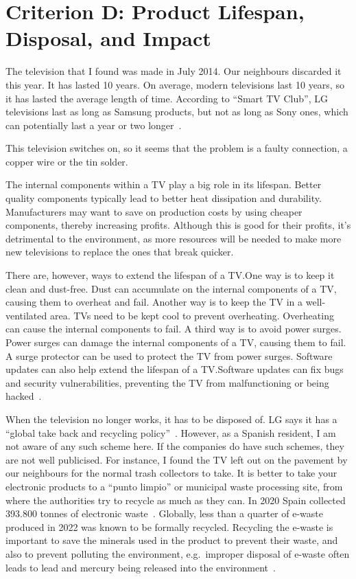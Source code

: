 \documentclass[12pt, letterpaper]{article}
\begin{document}
\section{Criterion D: Product Lifespan, Disposal, and Impact}

The television that I found was made in July 2014. Our neighbours
discarded it this year. It has lasted 10 years. On average, modern
televisions last 10 years, so it has lasted the average length of
time. According to ``Smart TV Club'', LG televisions last as long as
Samsung products, but not as long as Sony ones, which can potentially
last a year or two longer~\autocite{raj-2024}.

This television switches on, so it seems that the problem is a faulty
connection, a copper wire or the tin solder.

The internal components within a TV play a big role in its lifespan.
Better quality components typically lead to better heat dissipation
and durability. Manufacturers may want to save on production costs by
using cheaper components, thereby increasing profits. Although this
is good for their profits, it's detrimental to the environment, as
more resources will be needed to make more new televisions to replace
the ones that break quicker.

There are, however, ways to extend the lifespan of a TV.\@ One way is to
keep it clean and dust-free. Dust can accumulate on the internal
components of a TV, causing them to overheat and fail. Another way is
to keep the TV in a well-ventilated area. TVs need to be kept cool to
prevent overheating. Overheating can cause the internal components to
fail. A third way is to avoid power surges. Power surges can damage
the internal components of a TV, causing them to fail. A surge
protector can be used to protect the TV from power surges. Software
updates can also help extend the lifespan of a TV.\@ Software updates
can fix bugs and security vulnerabilities, preventing the TV from
malfunctioning or being hacked~\autocite{raj-2024}.

When the television no longer works, it has to be disposed of. LG
says it has a ``global take back and recycling
policy''~\autocite{lg-electronics-no-dateB}. However, as a Spanish
resident, I am not aware of any such scheme here. If the companies do
have such schemes, they are not well publicised. For instance, I
found the TV left out on the pavement by our neighbours for
the normal trash collectors to take. It is better to take your
electronic products to a ``punto limpio'' or municipal waste processing
site, from where the authorities try to recycle as much as they can.
In 2020 Spain collected 393.800 tonnes of electronic
waste~\autocite{it-digital-media-group-2023}.
Globally, less than a quarter of e-waste produced in 2022 was known
to be formally recycled. Recycling the e-waste is important to save
the minerals used in the product to prevent their waste, and also to
prevent polluting the environment, e.g.\ improper disposal of e-waste
often leads to lead and mercury being released into the
environment~\autocite{world-health-organization-2024}.
\end{document}
